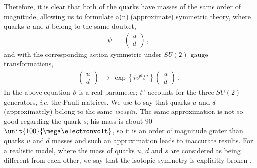 Therefore, it is clear that both of the quarks have masses of the same order of magnitude, 
allowing us to formulate a(n) (approximate) symmetric theory, where quarks $u$ and
$d$ belong to the same doublet,
\begin{eqnarray}
\psi ~=~ \left(
\begin{array}{ll}
u \\
d
\end{array}
\right)\,,
\end{eqnarray}
and with the corresponding action symmetric under $SU(2)$ gauge transformations,
\begin{eqnarray}
\left(
\begin{array}{ll}
u \\
d
\end{array}
\right)
~\to~ 
\exp\left\{ i\vartheta^{a} t^{a} \right\} 
\left(
\begin{array}{ll}
u \\
d
\end{array}
\right)\,.
\label{chiraltransf}
\end{eqnarray}
In the above equation $\vartheta$ is a real parameter; $t^{a}$ accounts for the three $SU(2)$
generators, \emph{i.e.} the Pauli matrices. We use to say that quarks $u$ and $d$
(approximately) belong to the same \emph{isospin}. The same approximation is not so good
regarding the quark $s$; his mass is about $90$ -- $\unit{100}{\mega\electronvolt}$, so it is
an order of magnitude grater than quarks $u$ and $d$ masses and such an approximation leads to
inaccurate results. For a realistic model, where the mass of quarks $u$, $d$ and $s$ are
considered as being different from each other, we say that the isotopic symmetry is explicitly
broken \cite{Weinberg:1996kr,Peskin:1995ev,Ryder:1985wq}. 

